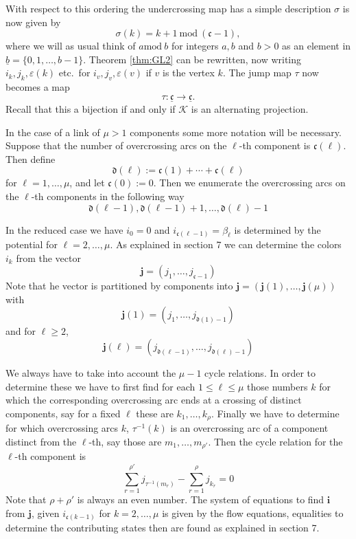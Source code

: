 \documentclass[11pt]{article}
\theoremstyle{definition}
\theoremstyle{remark}
\theoremstyle{remark}
\begin{document}
With respect to this ordering the undercrossing map has a simple description $\sigma $ is now given by 
$$\sigma (k)=k+1\ \textrm{mod}\ (\mathfrak{c}-1),$$
where we will as usual think of $a \textrm{mod}\ b$ for integers $a,b$ and $b>0$ as an element in $\underline{b}=\{0,1,\ldots ,b-1\}$. 
Theorem \ref{thm:GL2} can be rewritten, now writing $i_k, j_k,\varepsilon (k)$ etc.\ for $i_v, j_v,\varepsilon (v)$ if $v$ is the vertex $k$. The jump map $\tau $ now becomes a map 
$$\tau : \underline{\mathfrak{c}}\rightarrow \underline{\mathfrak{c}}.$$
Recall that this a bijection if and only if $\mathcal{K}$ is an alternating projection. 

In the case of a link of $\mu >1$ components some more notation will be necessary.
Suppose that the number of overcrossing arcs on the $\ell $-th component is $\mathfrak{c}(\ell )$. Then define
$$\mathfrak{d}(\ell ):=\mathfrak{c}(1)+\cdots +\mathfrak{c}(\ell )$$
for $\ell =1,\ldots ,\mu$, and let $\mathfrak{c}(0):=0$. 
Then we enumerate the overcrossing arcs on the $\ell $-th components in the following way
$$\mathfrak{d}(\ell -1),\mathfrak{d}(\ell -1) +1,\ldots ,\mathfrak{d}(\ell )-1$$

In the reduced case we have $i_0=0$ and  $i_{\mathfrak{c}(\ell -1)}=\beta_{\ell }$ is determined by the potential for $\ell =2,\ldots ,\mu $. As explained in section 7 we can determine the colors $i_k$ from the vector 
$$\mathbf{j}=(j_1,\ldots ,j_{\mathfrak{c}-1})$$
Note that he vector is partitioned by components into $\mathbf{j}=(\mathbf{j}(1),\ldots ,\mathbf{j}(\mu ))$ with
$$\mathbf{j}(1)=(j_1,\ldots ,j_{\mathfrak{d}(1)-1})$$
and for $\ell \geq 2$,
\begin{equation}\label{eq=comp}
\mathbf{j}(\ell )=(j_{\mathfrak{d}(\ell -1)},\ldots ,j_{\mathfrak{d}(\ell )-1})
\end{equation}

We always have to take into account the $\mu -1$ cycle relations. In order to determine these we have to first 
find for each $1\leq \ell \leq \mu$ those numbers $k$ for which the corresponding overcrossing arc ends at a crossing of distinct components, say for a fixed $\ell $ these are $k_1,\ldots ,k_{\rho }$. Finally we have to determine for which overcrossing arcs $k$, $\tau^{-1}(k)$ is an overcrossing arc of a component distinct from the $\ell $-th, say those are
$m_1,\ldots ,m_{\rho'}$.
Then the cycle relation for the $\ell $-th component is
$$\sum_{r=1}^{\rho '}j_{\tau^{-1}(m_r)}-\sum_{r=1}^{\rho }j_{k_r}=0$$
Note that $\rho +\rho '$ is always an even number.
The system of equations to find $\mathbf{i}$ from $\mathbf{j}$, given $i_{\mathfrak{c}(k-1)}$ for $k=2,\ldots ,\mu $ is given by the flow equations, equalities to determine the contributing states then are found as explained in section 7. 
\end{document}
